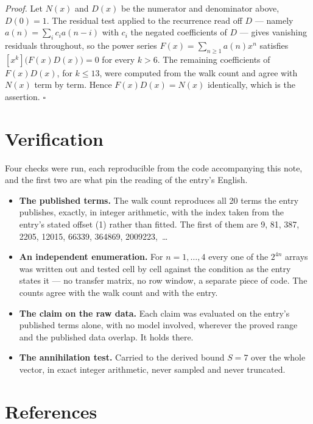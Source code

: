 \documentclass[11pt]{article}
\theoremstyle{definition}
\begin{document}
{\itshape Proof.} Let $N(x)$ and $D(x)$ be the numerator and denominator above, $D(0)=1$. The residual test applied to the recurrence read off $D$ --- namely $a(n) = \sum_i c_i a(n-i)$ with $c_i$ the negated coefficients of $D$ --- gives vanishing residuals throughout, so the power series $F(x)=\sum_{n\ge 1}a(n)x^n$ satisfies $[x^k]\bigl(F(x)D(x)\bigr) = 0$ for every $k > 6$. The remaining coefficients of $F(x)D(x)$, for $k \le 13$, were computed from the walk count and agree with $N(x)$ term by term. Hence $F(x)D(x) = N(x)$ identically, which is the assertion. $\square$

\section{Verification}

Four checks were run, each reproducible from the code accompanying this note, and the first two are what pin the reading of the entry's English.

\begin{itemize}

\item {\bfseries The published terms.} The walk count reproduces all 20 terms the entry publishes, exactly, in integer arithmetic, with the index taken from the entry's stated offset (1) rather than fitted. The first of them are 9, 81, 387, 2205, 12015, 66339, 364869, 2009223,~\dots

\item {\bfseries An independent enumeration.} For $n = 1,\dots,4$ every one of the $2^{4n}$ arrays was written out and tested cell by cell against the condition as the entry states it --- no transfer matrix, no row window, a separate piece of code. The counts agree with the walk count and with the entry.

\item {\bfseries The claim on the raw data.} Each claim was evaluated on the entry's published terms alone, with no model involved, wherever the proved range and the published data overlap. It holds there.

\item {\bfseries The annihilation test.} Carried to the derived bound $S = 7$ over the whole vector, in exact integer arithmetic, never sampled and never truncated.

\end{itemize}

\section{References}
\end{document}
